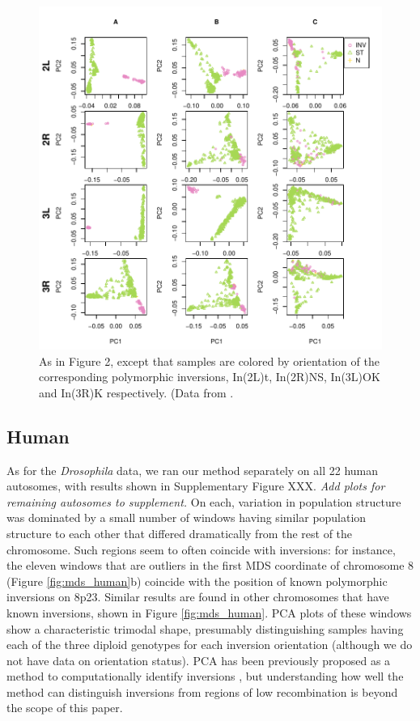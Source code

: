 \documentclass[11pt, oneside]{article}   	%
\newcommand{\plr}[1]{{\em \color{blue} #1}}
\begin{document}
\begin{figure}
    \begin{center}
       \includegraphics{Fig3_pca_plots_color_by_inv_allchr}
    \end{center}
    \caption{
         As in Figure 2, except that samples are colored by orientation of the corresponding polymorphic inversions, 
         In(2L)t, In(2R)NS, In(3L)OK and In(3R)K respectively. 
         (Data from \citet{lack2015drosophila}.
        \label{fig:color_inver}
    }
\end{figure}

\subsection{Human}

As for the \textit{Drosophila} data, we ran our method separately on all 22 human autosomes, 
with results shown in Supplementary Figure XXX.
\plr{Add plots for remaining autosomes to supplement.}
On each, variation in population structure was dominated by a small number of windows
having similar population structure to each other that differed dramatically from the rest of the chromosome.
Such regions seem to often coincide with inversions:
for instance, the eleven windows that are outliers in the first MDS coordinate of chromosome 8 (Figure \ref{fig:mds_human}b) 
coincide with the position of known polymorphic inversions on 8p23. 
Similar results are found in other chromosomes that have known inversions,
shown in Figure \ref{fig:mds_human}.
PCA plots of these windows show a characteristic trimodal shape,
presumably distinguishing samples having each of the three diploid genotypes for each inversion orientation
(although we do not have data on orientation status).
PCA has been previously proposed as a method to computationally identify inversions \citep{ma2012investigation},
but understanding how well the method can distinguish inversions from regions of low recombination
is beyond the scope of this paper.
\end{document}
